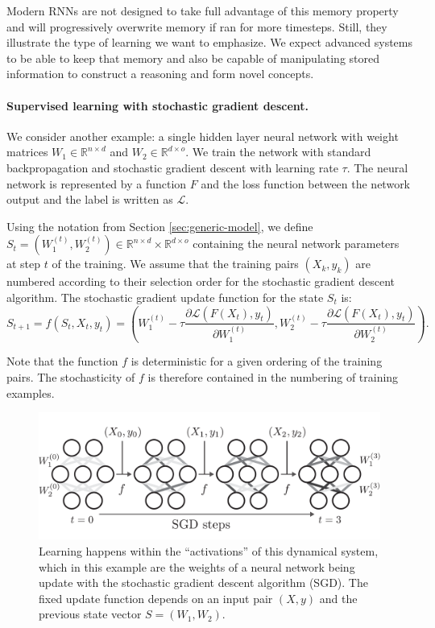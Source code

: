 Modern \acp{RNN} are not designed to take full advantage of this memory
property and will progressively overwrite memory if ran for more timesteps.
Still, they illustrate the type of learning we want to emphasize. We expect
advanced systems to be able to keep that memory and also be capable of
manipulating stored information to construct a reasoning and form novel concepts.

\paragraph{Supervised learning with stochastic gradient descent.}
\label{sec:superv-learn-with}
We consider another example: a single hidden layer neural network with weight
matrices $W_1 \in \mathbb{R}^{n \times d}$ and $W_2 \in \mathbb{R}^{d \times o}$. We train the network with
standard backpropagation and stochastic gradient descent with learning rate $\tau$.
The neural network is represented by a function $F$ and the loss function
between the network output and the label is written as $\mathcal{L}$.

Using the notation from Section \ref{sec:generic-model}, we define
$S_{t} = \left(W_{1}^{(t)}, W_{2}^{(t)}\right) \in \mathbb{R}^{n \times d} \times \mathbb{R}^{d \times o}$
containing the neural network parameters at step $t$ of the training. We assume
that the training pairs $(X_{k}, y_{k})$ are numbered according to their
selection order for the stochastic gradient descent algorithm.
The stochastic gradient update function for the state $S_{t}$ is:
\begin{equation}
  \label{eq:supervised-learning}
  S_{t+1} = {f}(S_t, X_t, y_t) = \left(W_1^{(t)} - \tau \frac{\partial
      \mathcal{L}(F(X_t), y_t)}{\partial W_1^{(t)}}, W_2^{(t)} - \tau \frac{\partial
      \mathcal{L}(F(X_t), y_t)}{\partial W_2^{(t)}} \right).
\end{equation}

Note that the function $f$ is deterministic for a given ordering of the training
pairs. The stochasticity of $f$ is therefore contained in the numbering of
training examples.

\begin{figure}[htbp]
  \centering
  \includegraphics[width=.9\linewidth]{figures/learning_nn.pdf}
  \caption{\label{fig:label} Learning happens within the ``activations'' of this
    dynamical system, which in this example are the weights of a neural
    network being update with the stochastic gradient descent algorithm (SGD). 
    The fixed update function depends on an input pair $(X, y)$
    and the previous state vector $S = (W_1, W_2)$.}
\end{figure}


